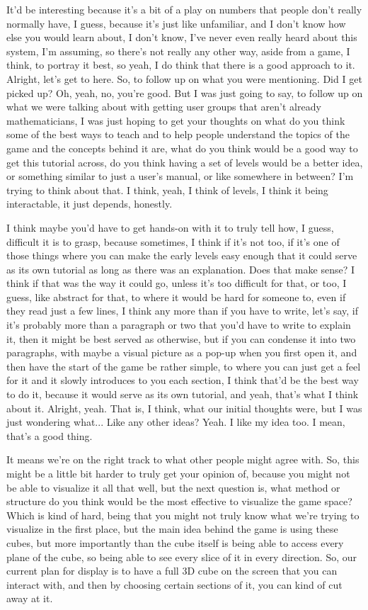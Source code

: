 \documentclass{article}
\begin{document}
It'd be interesting because it's a bit of a play on numbers that people don't really normally have, I
guess, because it's just like unfamiliar, and I don't know how else you would learn about, I don't
know, I've never even really heard about this system, I'm assuming, so there's not really any
other way, aside from a game, I think, to portray it best, so yeah, I do think that there is a good
approach to it. Alright, let's get to here. So, to follow up on what you were mentioning.
Did I get picked up? Oh, yeah, no, you're good. But I was just going to say, to follow up on what
we were talking about with getting user groups that aren't already mathematicians, I was just
hoping to get your thoughts on what do you think some of the best ways to teach and to help
people understand the topics of the game and the concepts behind it are, what do you think
would be a good way to get this tutorial across, do you think having a set of levels would be a
better idea, or something similar to just a user's manual, or like somewhere in between? I'm trying
to think about that. I think, yeah, I think of levels, I think it being interactable, it just depends,
honestly.

I think maybe you'd have to get hands-on with it to truly tell how, I guess, difficult it is to grasp,
because sometimes, I think if it's not too, if it's one of those things where you can make the early
levels easy enough that it could serve as its own tutorial as long as there was an explanation.
Does that make sense? I think if that was the way it could go, unless it's too difficult for that, or
too, I guess, like abstract for that, to where it would be hard for someone to, even if they read just
a few lines, I think any more than if you have to write, let's say, if it's probably more than a
paragraph or two that you'd have to write to explain it, then it might be best served as otherwise,
but if you can condense it into two paragraphs, with maybe a visual picture as a pop-up when you
first open it, and then have the start of the game be rather simple, to where you can just get a feel
for it and it slowly introduces to you each section, I think that'd be the best way to do it, because it
would serve as its own tutorial, and yeah, that's what I think about it. Alright, yeah.
That is, I think, what our initial thoughts were, but I was just wondering what... Like any other
ideas? Yeah. I like my idea too. I mean, that's a good thing.

It means we're on the right track to what other people might agree with. So, this might be a little
bit harder to truly get your opinion of, because you might not be able to visualize it all that well,
but the next question is, what method or structure do you think would be the most effective to
visualize the game space? Which is kind of hard, being that you might not truly know what we're
trying to visualize in the first place, but the main idea behind the game is using these cubes, but
more importantly than the cube itself is being able to access every plane of the cube, so being
able to see every slice of it in every direction. So, our current plan for display is to have a full 3D
cube on the screen that you can interact with, and then by choosing certain sections of it, you can
kind of cut away at it.
\end{document}
